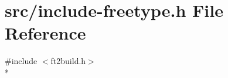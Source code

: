 \hypertarget{include-freetype_8h}{}\section{src/include-\/freetype.h File Reference}
\label{include-freetype_8h}
{\ttfamily \#include $<$ft2build.\+h$>$}\\*
